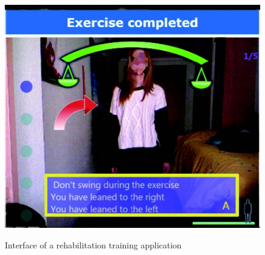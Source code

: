 \begin{figure}[htb]
\begin{minipage}[t]{0.41\linewidth}
		\includegraphics[width=1\linewidth]{Pictures/informationUIFeedbackSummary}
		\label{fig:informationUIFeedbackSummary}
	\end{minipage}
	\caption{Interface of a rehabilitation training application~\cite{Garrido2013-zs}}
	\label{fig:informationUIGarrido}
\end{figure}

